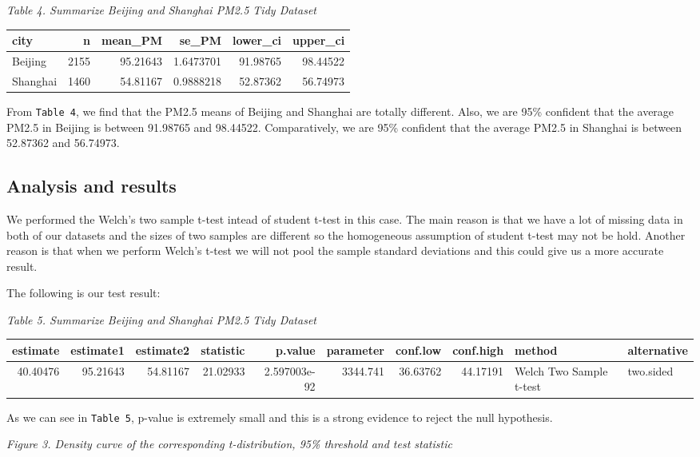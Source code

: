 \documentclass[]{article}
\begin{document}
\emph{Table 4. Summarize Beijing and Shanghai PM2.5 Tidy Dataset}

\begin{longtable}[]{@{}lrrrrr@{}}
\toprule
city & n & mean\_PM & se\_PM & lower\_ci & upper\_ci\tabularnewline
\midrule
\endhead
Beijing & 2155 & 95.21643 & 1.6473701 & 91.98765 &
98.44522\tabularnewline
Shanghai & 1460 & 54.81167 & 0.9888218 & 52.87362 &
56.74973\tabularnewline
\bottomrule
\end{longtable}

From \texttt{Table\ 4}, we find that the PM2.5 means of Beijing and
Shanghai are totally different. Also, we are 95\% confident that the
average PM2.5 in Beijing is between 91.98765 and 98.44522.
Comparatively, we are 95\% confident that the average PM2.5 in Shanghai
is between 52.87362 and 56.74973.

\subsection{Analysis and results}\label{analysis-and-results}

We performed the Welch's two sample t-test intead of student t-test in
this case. The main reason is that we have a lot of missing data in both
of our datasets and the sizes of two samples are different so the
homogeneous assumption of student t-test may not be hold. Another reason
is that when we perform Welch's t-test we will not pool the sample
standard deviations and this could give us a more accurate result.

The following is our test result:

\emph{Table 5. Summarize Beijing and Shanghai PM2.5 Tidy Dataset}

\begin{longtable}[]{@{}rrrrrrrrll@{}}
\toprule
estimate & estimate1 & estimate2 & statistic & p.value & parameter &
conf.low & conf.high & method & alternative\tabularnewline
\midrule
\endhead
40.40476 & 95.21643 & 54.81167 & 21.02933 & 2.597003e-92 & 3344.741 &
36.63762 & 44.17191 & Welch Two Sample t-test & two.sided\tabularnewline
\bottomrule
\end{longtable}

As we can see in \texttt{Table\ 5}, p-value is extremely small and this
is a strong evidence to reject the null hypothesis.

\emph{Figure 3. Density curve of the corresponding t-distribution, 95\%
threshold and test statistic}
\end{document}
